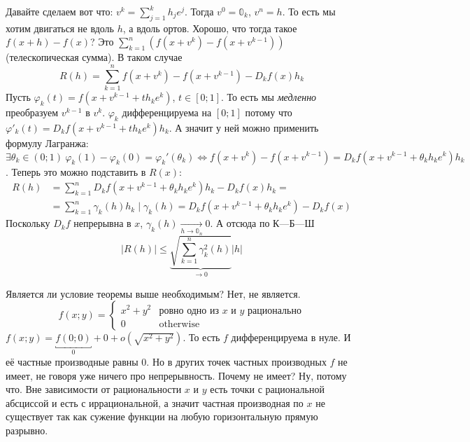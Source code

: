 \documentclass{article}
\begin{document}
\begin{itemize}
\begin{Proof}
            Давайте сделаем вот что: $v^k=\sum\limits_{j=1}^kh_je^j$. Тогда $v^0=\mathbb 0_k$, $v^n=h$. То есть мы хотим двигаться не вдоль $h$, а вдоль ортов. Хорошо, что тогда такое $f(x+h)-f(x)$? Это $\sum\limits_{k=1}^n(f(x+v^k)-f(x+v^{k-1}))$ (телескопическая сумма). В таком случае
            $$
            R(h)=\sum\limits_{k=1}^nf(x+v^k)-f(x+v^{k-1})-D_kf(x)h_k
            $$
            Пусть $\varphi_k(t)=f(x+v^{k-1}+th_ke^k)$, $t\in[0;1]$. То есть мы \textit{медленно} преобразуем $v^{k-1}$ в $v^k$. $\varphi_k$ дифференцируема на $[0;1]$ потому что $\varphi'_k(t)=D_kf(x+v^{k-1}+th_ke^k)h_k$. А значит у ней можно применить формулу Лагранжа: $\exists\theta_k\in(0;1)~\varphi_k(1)-\varphi_k(0)=\varphi_k'(\theta_k)\Leftrightarrow f(x+v^k)-f(x+v^{k-1})=D_kf(x+v^{k-1}+\theta_k h_ke^k)h_k$. Теперь это можно подставить в $R(x)$:
            \[
            \begin{split}
                R(h)&=\sum\limits_{k=1}^nD_kf(x+v^{k-1}+\theta_k h_ke^k)h_k-D_kf(x)h_k=\\
                &=\sum\limits_{k=1}^n\gamma_k(h)h_k\mid\gamma_k(h)=D_kf(x+v^{k-1}+\theta_k h_ke^k)-D_kf(x)
            \end{split}
            \]
            Поскольку $D_kf$ непрерывна в $x$, $\gamma_k(h)\underset{h\to\mathbb0_n}\longrightarrow0$. А отсюда по К---Б---Ш
            $$
            |R(h)|\leqslant\underbrace{\sqrt{\sum\limits_{k=1}^n\gamma_k^2(h)}}_{\to0}|h|
            $$
        \end{Proof}
        \begin{Example}
            Является ли условие теоремы выше необходимым? Нет, не является.
            $$
            f(x;y)=\begin{cases}
                x^2+y^2 & \text{ровно одно из }x\text{ и }y\text{ рационально}\\
                0 & \mathrm{otherwise}
            \end{cases}
            $$
            $f(x;y)=\underbracket{f(0;0)}_0+0+o(\sqrt{x^2+y^2})$. То есть $f$ дифференцируема в нуле. И её частные производные равны 0. Но в других точек частных производных $f$ не имеет, не говоря уже ничего про непрерывность. Почему не имеет? Ну, потому что. Вне зависимости от рациональности $x$ и $y$ есть точки с рациональной абсциссой и есть с иррациональной, а значит частная производная по $x$ не существует так как сужение функции на любую горизонтальную прямую разрывно.
        \end{Example}
        \begin{Example}

\end{Example}
\end{itemize}
\end{document}
